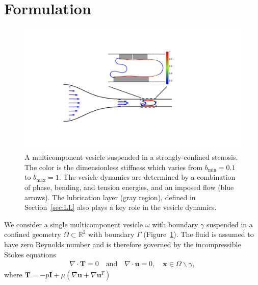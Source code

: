 \documentclass[twoside,twocolumn,9pt]{article}
\newcommand{\RR}{\mathbb{R}}
\newcommand{\uu}{\mathbf{u}}
\newcommand{\TT}{\mathbf{T}}
\newcommand{\xx}{\mathbf{x}}
\begin{document}
\section{\label{sec:Formulation}Formulation}
\begin{figure}[H]
  \centering
  \includegraphics[width=0.9\columnwidth]{figures/schematic.pdf}
  \caption{\label{fig:schematic}\small A multicomponent vesicle
  suspended in a strongly-confined stenosis. The color is the
  dimensionless stiffness which varies from $b_{\min} = 0.1$ to
  $b_{\max} = 1$. The vesicle dynamics are determined by a combination
  of phase, bending, and tension energies, and an imposed flow (blue
  arrows). The lubrication layer (gray region), defined in
  Section~\ref{sec:LL} also plays a key role in the vesicle dynamics.}
\end{figure}
We consider a single multicomponent vesicle $\omega$ with boundary
$\gamma$ suspended in a confined geometry $\Omega \subset \RR ^2$ with
boundary $\Gamma$ (Figure~\ref{fig:schematic}). The fluid is assumed to
have zero Reynolds number and is therefore governed by the
incompressible Stokes equations
\begin{align}
    \nabla \cdot \TT = 0 \quad \text{and} \quad \nabla \cdot \uu = 0, 
        \quad \xx \in \Omega \backslash \gamma,
\end{align}
where $\TT = -p\mathbf{I} + \mu\left(\nabla \uu + \nabla \uu^T \right)$
\end{document}
